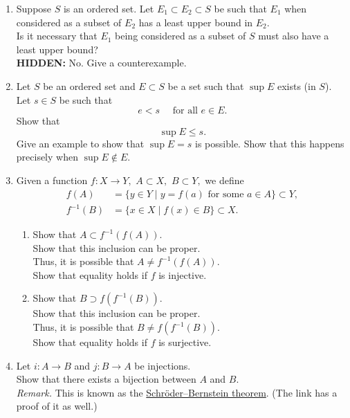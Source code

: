 \documentclass[12pt]{article}
\theoremstyle{definition}
\numberwithin{thm}{section}
\newcommand{\hint}[1]{\textbf{HIDDEN:} {\color[rgb]{0.95, 0.95, 0.95}#1}}
\begin{document}
\begin{enumerate}
	\item Suppose $S$ is an ordered set. Let $E_1 \subset E_2 \subset S$ be such that $E_1$ when considered as a subset of $E_2$ has a least upper bound in $E_2.$\\
	Is it necessary that $E_1$ being considered as a subset of $S$ must also have a least upper bound?\\
	\hint{No. Give a counterexample.}
	\item Let $S$ be an ordered set and $E \subset S$ be a set such that $\sup E$ exists (in $S$).\\
	Let $s \in S$ be such that
	\begin{equation*} 
		e < s \quad \text{ for all } e \in E.
	\end{equation*} 
	Show that
	\begin{equation*} 
		\sup E \le s.
	\end{equation*}
	Give an example to show that $\sup E = s$ is possible. Show that this happens precisely when $\sup E \notin E.$
	\item \label{q:funcinvproperties}%
	Given a function $f:X \to Y,$ $A \subset X,$ $B \subset Y,$ we define
	\begin{align*} 
		f(A) &= \{y \in Y \mid y = f(a) \text{ for some } a \in A\} \subset Y,\\
		f^{-1}(B) &= \{x \in X \mid f(x) \in B\} \subset X.
	\end{align*}
	\begin{enumerate}
		\item Show that $A \subset f^{-1}(f(A)).$ \\
		Show that this inclusion can be proper. \\
		Thus, it is possible that $A \neq f^{-1}(f(A)).$ \\
		Show that equality holds if $f$ is injective.
		\item Show that $B \supset f(f^{-1}(B)).$ \\
		Show that this inclusion can be proper. \\
		Thus, it is possible that $B \neq f(f^{-1}(B)).$ \\
		Show that equality holds if $f$ is surjective.
	\end{enumerate}
	\item Let $i:A \to B$ and $j:B\to A$ be injections.\\
	Show that there exists a bijection between $A$ and $B.$\\
	\emph{Remark.} This is known as the \href{https://en.wikipedia.org/wiki/Schr%C3%B6der%E2%80%93Bernstein_theorem}{Schröder–Bernstein theorem}. (The link has a proof of it as well.)

\end{enumerate}
\end{document}
